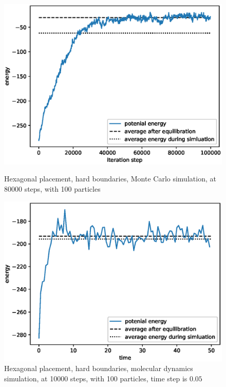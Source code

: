 \documentclass[UTF8,a4paper]{article}
\begin{document}
\begin{figure}[H]
	\centering
	\begin{minipage}[t]{0.45\textwidth}
		\centering
		\includegraphics[height=0.2\textheight]{fig/exp2_hex_hard_mc.eps}
		\caption{Hexagonal placement, hard boundaries, Monte Carlo simulation, at 80000 steps, with 100 particles}
	\end{minipage}\hspace{0.5cm}
	\begin{minipage}[t]{0.45\textwidth}
		\centering
		\includegraphics[height=0.2\textheight]{fig/md_plot_norand_hard_10000_steps_100_particles_0.8442_rho_0.728_tempure_.eps}
		\caption{Hexagonal placement, hard boundaries, molecular dynamics simulation, at 10000 steps, with 100 particles, time step is $0.05$}
	\end{minipage}
\end{figure}
\end{document}

